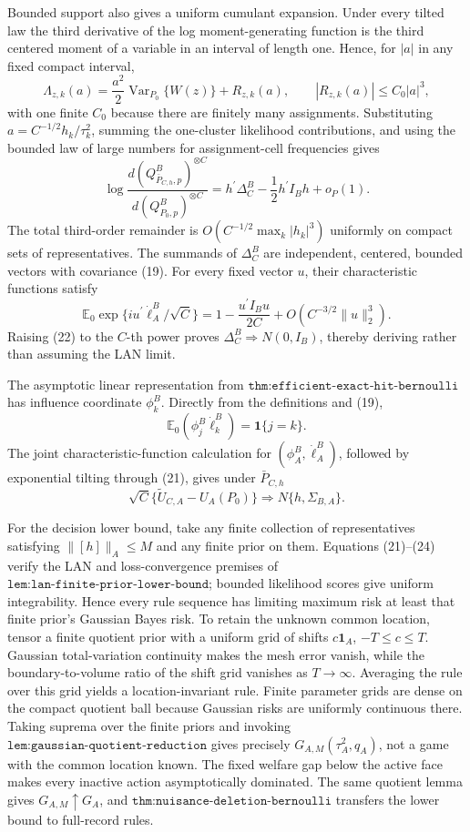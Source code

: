 Bounded support also gives a uniform cumulant expansion.  Under every tilted law the third derivative of the log moment-generating function is the third centered moment of a variable in an interval of length one.  Hence, for \(|a|\) in any fixed compact interval,
\[
\Lambda_{z,k}(a)=\frac{a^2}{2}\operatorname{Var}_{P_0}\{W(z)\}+R_{z,k}(a),
\qquad |R_{z,k}(a)|\leq C_0|a|^3, \tag{20}
\]
with one finite \(C_0\) because there are finitely many assignments.  Substituting \(a=C^{-1/2}h_k/\tau_k^2\), summing the one-cluster likelihood contributions, and using the bounded law of large numbers for assignment-cell frequencies gives
\[
\log\frac{d(Q^B_{\bar P_{C,h},p})^{\otimes C}}
         {d(Q^B_{P_0,p})^{\otimes C}}
=h^{\prime}\Delta_C^B-\frac12h^{\prime}I_Bh+o_P(1). \tag{21}
\]
The total third-order remainder is \(O(C^{-1/2}\max_k|h_k|^3)\) uniformly on compact sets of representatives.  The summands of \(\Delta_C^B\) are independent, centered, bounded vectors with covariance (19).  For every fixed vector \(u\), their characteristic functions satisfy
\[
\mathbb E_0\exp\{i u^{\prime}\dot\ell_A^B/\sqrt C\}
=1-\frac{u^{\prime}I_Bu}{2C}+O(C^{-3/2}\lVert u\rVert_2^3). \tag{22}
\]
Raising (22) to the \(C\)-th power proves \(\Delta_C^B\Rightarrow N(0,I_B)\), thereby deriving rather than assuming the LAN limit.

The asymptotic linear representation from \(\texttt{thm:efficient-exact-hit-bernoulli}\) has influence coordinate \(\phi_k^B\).  Directly from the definitions and (19),
\[
\mathbb E_0(\phi_j^B\dot\ell_k^B)=\mathbf1\{j=k\}. \tag{23}
\]
The joint characteristic-function calculation for \((\phi_A^B,\dot\ell_A^B)\), followed by exponential tilting through (21), gives under \(\bar P_{C,h}\)
\[
\sqrt C\{\widetilde U_{C,A}-U_A(P_0)\}
\Rightarrow N\{h,\Sigma_{B,A}\}. \tag{24}
\]

For the decision lower bound, take any finite collection of representatives satisfying \(\lVert[h]\rVert_A\leq M\) and any finite prior on them.  Equations (21)--(24) verify the LAN and loss-convergence premises of \(\texttt{lem:lan-finite-prior-lower-bound}\); bounded likelihood scores give uniform integrability.  Hence every rule sequence has limiting maximum risk at least that finite prior's Gaussian Bayes risk.  To retain the unknown common location, tensor a finite quotient prior with a uniform grid of shifts \(c\mathbf1_A\), \(-T\leq c\leq T\).  Gaussian total-variation continuity makes the mesh error vanish, while the boundary-to-volume ratio of the shift grid vanishes as \(T\to\infty\).  Averaging the rule over this grid yields a location-invariant rule.  Finite parameter grids are dense on the compact quotient ball because Gaussian risks are uniformly continuous there.  Taking suprema over the finite priors and invoking \(\texttt{lem:gaussian-quotient-reduction}\) gives precisely \(G_{A,M}(\tau_A^2,q_A)\), not a game with the common location known.  The fixed welfare gap below the active face makes every inactive action asymptotically dominated.  The same quotient lemma gives \(G_{A,M}\uparrow G_A\), and \(\texttt{thm:nuisance-deletion-bernoulli}\) transfers the lower bound to full-record rules.

